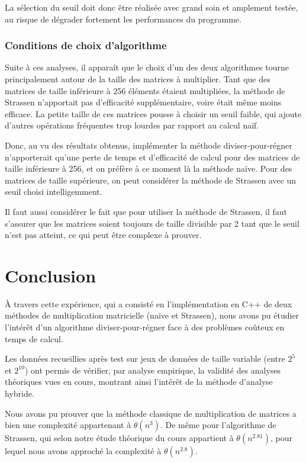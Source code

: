\documentclass[10pt,a4paper]{article}
\begin{document}
La sélection du seuil doit donc être réalisée avec grand soin et amplement testée, au risque de dégrader fortement les performances du programme.

\subsubsection{Conditions de choix d'algorithme}

Suite à ces analyses, il apparaît que le choix d'un des deux algorithmes tourne principalement autour de la taille des matrices à multiplier. Tant que des matrices de taille inférieure à 256 éléments étaient multipliées, la méthode de Strassen n'apportait pas d'efficacité supplémentaire, voire était même moins efficace. La petite taille de ces matrices pousse à choisir un seuil faible, qui ajoute d'autres opérations fréquentes trop lourdes par rapport au calcul naïf.

Donc, au vu des résultats obtenus, implémenter la méthode diviser-pour-régner n'apporterait qu'une perte de temps et d'efficacité de calcul pour des matrices de taille inférieure à 256, et on préfère à ce moment là la méthode naïve. Pour des matrices de taille supérieure, on peut considérer la méthode de Strassen avec un seuil choisi intelligemment.

Il faut aussi considérer le fait que pour utiliser la méthode de Strassen, il faut s'assurer que les matrices soient toujours de taille divisible par 2 tant que le seuil n'est pas atteint, ce qui peut être complexe à prouver.

\section{Conclusion}

À travers cette expérience, qui a consisté en l'implémentation en C++ de deux méthodes de multiplication matricielle (naïve et Strassen), nous avons pu étudier l'intérêt d'un algorithme diviser-pour-régner face à des problèmes coûteux en temps de calcul.

Les données recueillies après test sur jeux de données de taille variable (entre $ 2^{5} $ et $ 2^{10} $) ont permis de vérifier, par analyse empirique, la validité des analyses théoriques vues en cours, montrant ainsi l'intérêt de la méthode d'analyse hybride.

Nous avons pu prouver que la méthode classique de multiplication de matrices a bien une complexité appartenant à $ \theta (n^{3}) $. De même pour l'algorithme de Strassen, qui selon notre étude théorique du cours appartient à $ \theta (n^{2.81}) $, pour lequel nous avons approché la complexité à $ \theta (n^{2.8}) $.
\end{document}

